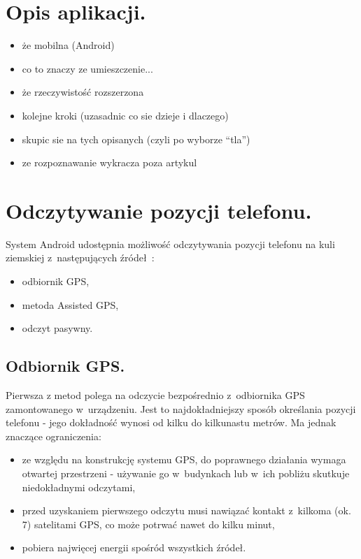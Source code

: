 \documentclass[a4paper,twocolumn,11pt]{article}
\begin{document}

\section{Opis aplikacji.} \label{sec:app_description}

\begin{itemize}
 \item że mobilna (Android)
 \item co to znaczy ze umieszczenie...
 \item że rzeczywistość rozszerzona
 \item kolejne kroki (uzasadnic co sie dzieje i dlaczego)
 \item skupic sie na tych opisanych (czyli po wyborze ``tla'')
 \item ze rozpoznawanie wykracza poza artykul
\end{itemize}



\section{Odczytywanie pozycji telefonu.} \label{sec:position_tracking}

System Android udostępnia możliwość odczytywania pozycji telefonu na kuli ziemskiej z~następujących źródeł~\cite{and:loc}:

\begin{itemize}
 \item odbiornik GPS,
 \item metoda Assisted GPS,
 \item odczyt pasywny.
\end{itemize}


\subsection{Odbiornik GPS.}
 Pierwsza z metod polega na odczycie bezpośrednio z~odbiornika GPS zamontowanego w~urządzeniu.
 Jest to najdokładniejszy sposób określania pozycji telefonu - jego dokładność wynosi od kilku do kilkunastu metrów.
 Ma jednak znaczące ograniczenia:
 \begin{itemize}
  \item ze względu na konstrukcję systemu GPS, do poprawnego działania wymaga otwartej przestrzeni - używanie go w~budynkach lub w~ich pobliżu skutkuje niedokładnymi odczytami,
  \item przed uzyskaniem pierwszego odczytu musi nawiązać kontakt z~kilkoma (ok. 7) satelitami GPS, co może potrwać nawet do kilku minut,
  \item pobiera najwięcej energii spośród wszystkich źródeł.
 \end{itemize}
\end{document}
